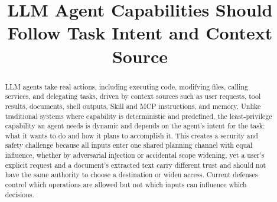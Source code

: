 \documentclass[sigconf,nonacm]{acmart}
\begin{document}
\title{LLM Agent Capabilities Should Follow Task Intent and Context Source}

\begin{abstract}
LLM agents take real actions, including executing code, modifying files, calling services, and delegating tasks, driven by context sources such as user requests, tool results, documents, shell outputs, Skill and MCP instructions, and memory.
Unlike traditional systems where capability is deterministic and predefined, the least-privilege capability an agent needs is dynamic and depends on the agent's intent for the task: what it wants to do and how it plans to accomplish it.
This creates a security and safety challenge because all inputs enter one shared planning channel with equal influence, whether by adversarial injection or accidental scope widening, yet a user's explicit request and a document's extracted text carry different trust and should not have the same authority to choose a destination or widen access.
Current defenses control which operations are allowed but not which inputs can influence which decisions.


\end{abstract}
\end{document}
